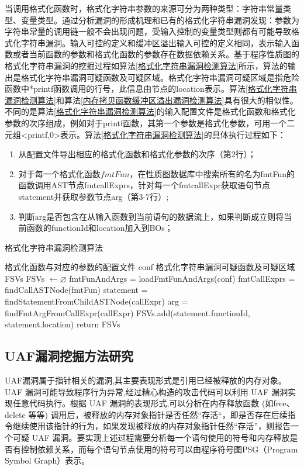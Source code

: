 {当调用格式化函数时，格式化字符串参数的来源可分为两种类型：字符串常量类型、变量类型。通过分析漏洞的形成机理和已有的格式化字符串漏洞发现：参数为字符串常量的调用链一般不会出现问题，受输入控制的变量类型则都有可能导致格式化字符串漏洞。输入可控的定义和缓冲区溢出输入可控的定义相同，表示输入函数或者当前函数的参数和格式化函数的参数存在数据依赖关系。基于程序性质图的格式化字符串漏洞的挖掘过程如算法\ref{格式化字符串漏洞检测算法}所示，算法的输出是格式化字符串漏洞可疑函数及可疑区域。格式化字符串漏洞可疑区域是指危险函数中*printf函数调用的行号，此信息由节点的location表示。算法\ref{格式化字符串漏洞检测算法}和算法\ref{内存拷贝函数缓冲区溢出漏洞检测算法}具有很大的相似性。不同的是算法\ref{格式化字符串漏洞检测算法}的输入配置文件是格式化函数和格式化参数的次序组成，例如对于printf函数，其第一个参数是格式化参数，可用一个二元组<printf,0>表示。算法\ref{格式化字符串漏洞检测算法}的具体执行过程如下：
\begin{enumerate}[(1)]
\item 从配置文件导出相应的格式化函数和格式化参数的次序（第2行）；
\item 对于每一个格式化函数$fmtFun$，在性质图数据库中搜索所有的名为fmtFun的函数调用AST节点fmtcallExprs，针对每一个fmtcallExpr获取语句节点statement并获取参数节点arg（第3-7行）;
\item 
判断arg是否包含在从输入函数到当前语句的数据流上，如果判断成立则将当前函数的functionId和location加入到BOs；
\end{enumerate}

\begin{algorithm}
	\renewcommand{\algorithmicrequire}{\textbf{Input:}}
	\renewcommand{\algorithmicensure}{\textbf{Output:}}
	\caption{格式化字符串漏洞检测算法}
	\label{格式化字符串漏洞检测算法}
	\begin{algorithmic}[1]
		\REQUIRE 格式化函数与对应的参数的配置文件 conf
		\ENSURE 格式化字符串漏洞可疑函数及可疑区域 FSVs
		\STATE FSVs $\leftarrow \varnothing$
		\STATE fmtFunAndArgs = loadFmtFunAndArgs(conf)
			\STATE fmtCallExprs = findCallASTNode(fmtFun)
				\STATE statement = findStatementFromChildASTNode(callExpr)
				\STATE arg = findFmtArgFromCallExpr(callExpr)
					\STATE FSVs.add(statement.functionId, statement.location)
				\ENDIF
			\ENDFOR
		\ENDFOR	
	\STATE return FSVs	
	\end{algorithmic}
\end{algorithm}

\subsection{UAF漏洞挖掘方法研究}
UAF漏洞属于指针相关的漏洞,其主要表现形式是引用已经被释放的内存对象。UAF 漏洞可能导致程序行为异常,经过精心构造的攻击代码可以利用 UAF 漏洞实现任意代码执行。根据 UAF 漏洞的表现形式,可以分析在内存释放函数 (如free、delete 等等) 调用后，被释放的内存对象指针是否任然“存活“，即是否存在后续指令继续使用该指针的行为，如果发现被释放的内存对象指针任然“存活”，则报告一个可疑 UAF 漏洞。要实现上述过程需要分析每一个语句使用的符号和内存释放是否有控制依赖关系，而每个语句节点使用的符号可以由程序符号图PSG（Program Symbol Graph）表示。

}
